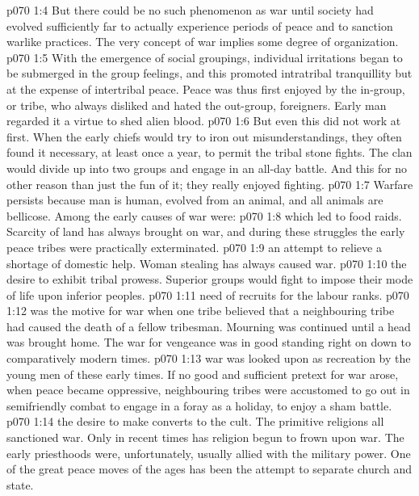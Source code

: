 \vs p070 1:4 But there could be no such phenomenon as war until society had evolved sufficiently far to actually experience periods of peace and to sanction warlike practices. The very concept of war implies some degree of organization.
\vs p070 1:5 With the emergence of social groupings, individual irritations began to be submerged in the group feelings, and this promoted intratribal tranquillity but at the expense of intertribal peace. Peace was thus first enjoyed by the in\hyp{}group, or tribe, who always disliked and hated the out\hyp{}group, foreigners. Early man regarded it a virtue to shed alien blood.
\vs p070 1:6 But even this did not work at first. When the early chiefs would try to iron out misunderstandings, they often found it necessary, at least once a year, to permit the tribal stone fights. The clan would divide up into two groups and engage in an all\hyp{}day battle. And this for no other reason than just the fun of it; they really enjoyed fighting.
\vs p070 1:7 \pc Warfare persists because man is human, evolved from an animal, and all animals are bellicose. Among the early causes of war were:
\vs p070 1:8 \bibnobreakspace {} which led to food raids. Scarcity of land has always brought on war, and during these struggles the early peace tribes were practically exterminated.
\vs p070 1:9 \bibnobreakspace {} an attempt to relieve a shortage of domestic help. Woman stealing has always caused war.
\vs p070 1:10 \bibnobreakspace {} the desire to exhibit tribal prowess. Superior groups would fight to impose their mode of life upon inferior peoples.
\vs p070 1:11 \bibnobreakspace {} need of recruits for the labour ranks.
\vs p070 1:12 \bibnobreakspace {} was the motive for war when one tribe believed that a neighbouring tribe had caused the death of a fellow tribesman. Mourning was continued until a head was brought home. The war for vengeance was in good standing right on down to comparatively modern times.
\vs p070 1:13 \bibnobreakspace {} war was looked upon as recreation by the young men of these early times. If no good and sufficient pretext for war arose, when peace became oppressive, neighbouring tribes were accustomed to go out in semifriendly combat to engage in a foray as a holiday, to enjoy a sham battle.
\vs p070 1:14 \bibnobreakspace {} the desire to make converts to the cult. The primitive religions all sanctioned war. Only in recent times has religion begun to frown upon war. The early priesthoods were, unfortunately, usually allied with the military power. One of the great peace moves of the ages has been the attempt to separate church and state.

